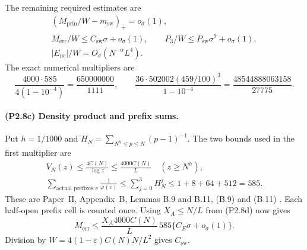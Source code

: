 The remaining required estimates are
\begin{equation}\label{eq:l3-small-estimates}
\begin{gathered}
 (M_{\mathrm{prin}}/W-m_{\mathrm{sw}})_+=o_\sigma(1),\\
 M_{\mathrm{err}}/W\le C_{\mathrm{sw}}\sigma+o_\sigma(1),\qquad
 P_3/W\le P_{\mathrm{sw}}\sigma^9+o_\sigma(1),\\
 |E_{\mathrm{nc}}|/W=O_\sigma(N^{-\alpha}L^4).
\end{gathered}
\end{equation}
The exact numerical multipliers are
\begin{equation}\label{eq:l3-multipliers}
 \frac{4000\cdot585}{4(1-10^{-4})}=\frac{650000000}{1111},\qquad
 \frac{36\cdot502002(459/100)^3}{1-10^{-4}}
                       =\frac{48544888063158}{27775}.
\end{equation}
\paragraph{(P2.8c) Density product and prefix sums.}
Put $h=1/1000$ and $H_N=\sum_{N^h\le p\le N}(p-1)^{-1}$.
The two bounds used in the first multiplier are
\begin{equation}\label{eq:l3-mass-prefix-sums}
\begin{gathered}
 V_N(z)\le\frac{4C(N)}{\log z}\le\frac{4000C(N)}L
                                  \quad(z\ge N^h),\\
 \sum_{\text{actual prefixes }v}\frac1{\varphi(v)}
       \le\sum_{j=0}^3H_N^j\le1+8+64+512=585.
\end{gathered}
\end{equation}
These are Paper~II, Appendix~B, Lemmas B.9 and B.11,
(B.9) and (B.11) \cite[Appendix~B, Lemmas B.9, B.11, (B.9), (B.11)]{PaperII}.
Each half-open prefix cell is counted once.
Using $X_A\le N/L$ from (P2.8d) now gives
\begin{equation}\label{eq:l3-secondary-mass-step}
 M_{\mathrm{err}}\le\frac{X_A4000C(N)}L\,585
               \{C_E\sigma+o_\sigma(1)\}.
\end{equation}
Division by $W=4(1-\varepsilon)C(N)N/L^2$ gives $C_{\mathrm{sw}}$.

